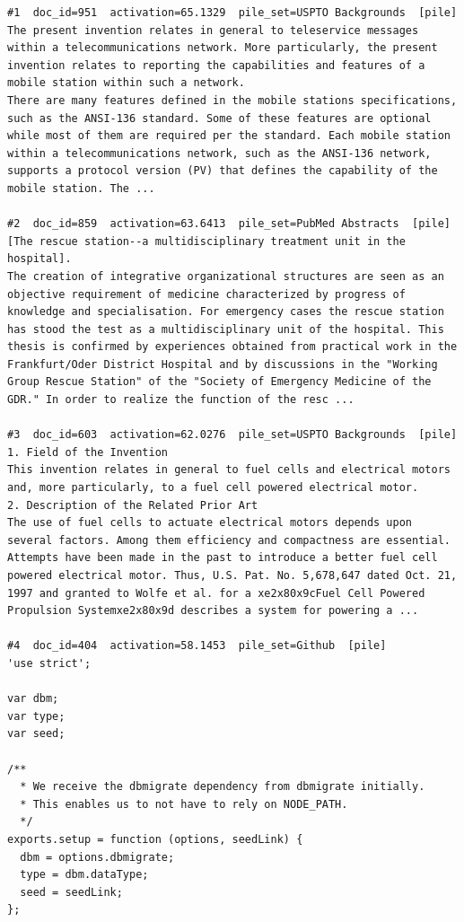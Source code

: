 \begin{verbatim}
#1  doc_id=951  activation=65.1329  pile_set=USPTO Backgrounds  [pile]
The present invention relates in general to teleservice messages within a telecommunications network. More particularly, the present invention relates to reporting the capabilities and features of a mobile station within such a network.
There are many features defined in the mobile stations specifications, such as the ANSI-136 standard. Some of these features are optional while most of them are required per the standard. Each mobile station within a telecommunications network, such as the ANSI-136 network, supports a protocol version (PV) that defines the capability of the mobile station. The ...

#2  doc_id=859  activation=63.6413  pile_set=PubMed Abstracts  [pile]
[The rescue station--a multidisciplinary treatment unit in the hospital].
The creation of integrative organizational structures are seen as an objective requirement of medicine characterized by progress of knowledge and specialisation. For emergency cases the rescue station has stood the test as a multidisciplinary unit of the hospital. This thesis is confirmed by experiences obtained from practical work in the Frankfurt/Oder District Hospital and by discussions in the "Working Group Rescue Station" of the "Society of Emergency Medicine of the GDR." In order to realize the function of the resc ...

#3  doc_id=603  activation=62.0276  pile_set=USPTO Backgrounds  [pile]
1. Field of the Invention
This invention relates in general to fuel cells and electrical motors and, more particularly, to a fuel cell powered electrical motor.
2. Description of the Related Prior Art
The use of fuel cells to actuate electrical motors depends upon several factors. Among them efficiency and compactness are essential.
Attempts have been made in the past to introduce a better fuel cell powered electrical motor. Thus, U.S. Pat. No. 5,678,647 dated Oct. 21, 1997 and granted to Wolfe et al. for a xe2x80x9cFuel Cell Powered Propulsion Systemxe2x80x9d describes a system for powering a ...

#4  doc_id=404  activation=58.1453  pile_set=Github  [pile]
'use strict';

var dbm;
var type;
var seed;

/**
  * We receive the dbmigrate dependency from dbmigrate initially.
  * This enables us to not have to rely on NODE_PATH.
  */
exports.setup = function (options, seedLink) {
  dbm = options.dbmigrate;
  type = dbm.dataType;
  seed = seedLink;
};


\end{verbatim}
